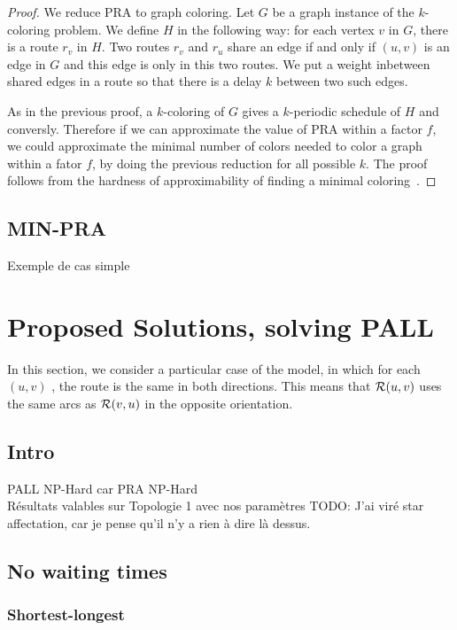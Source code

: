\documentclass[a4paper,10pt]{article}
\newcommand{\todo}[1]{{\color{red} TODO: {#1}}}
\begin{document}
    \begin{proof}
    We reduce PRA to graph coloring. Let $G$ be a graph instance of the $k$-coloring problem. 
    We define $H$ in the following way: for each vertex $v$ in $G$, there is a route $r_v$ in $H$.
    Two routes $r_v$ and $r_u$ share an edge if and only if $(u,v)$ is an edge in $G$ and this edge is only in this two routes. 
    We put a weight inbetween shared edges in a route so that there is a delay $k$ between two such edges. 
    
    As in the previous proof, a $k$-coloring of $G$ gives a $k$-periodic schedule of $H$
    and conversly. Therefore if we can approximate the value of PRA  within a factor $f$,
    we could approximate the minimal number of colors needed to color a graph within a fator $f$, 
    by doing the previous reduction for all possible $k$. The proof follows from the hardness of approximability
    of finding a minimal coloring~\cite{zuckerman2006linear}.
    \end{proof}


   
  \subsection{MIN-PRA}
    Exemple de cas simple
    
\section{Proposed Solutions, solving PALL}
  
  In this section, we consider a particular case of the model, in which for each $(u,v)$ , the route is the same in both directions. This means that ${\cal R}(u,v)$ uses the same arcs as ${\cal R}(v,u)$ in the opposite orientation.
  \subsection{Intro}
    PALL NP-Hard car PRA NP-Hard\\
    Résultats valables sur Topologie 1 avec nos paramètres
    \todo{J'ai viré star affectation, car je pense qu'il n'y a rien à dire là dessus.}
    
  \subsection{No waiting times}
    \subsubsection{Shortest-longest}
\end{document}

